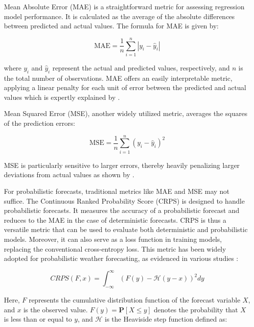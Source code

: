 \documentclass{article}
\begin{document}
Mean Absolute Error (MAE) is a straightforward metric for assessing regression model performance. It is calculated as the average of the absolute differences between predicted and actual values. The formula for MAE is given by:

\begin{equation}\label{eq:MAE}
\text{MAE} = \frac{1}{n} \sum_{i=1}^{n} \left| y_i - \hat{y}_i \right|
\end{equation}


where $y_i$ and $\hat{y}_i$ represent the actual and predicted values, respectively, and $n$ is the total number of observations. MAE offers an easily interpretable metric, applying a linear penalty for each unit of error between the predicted and actual values which is expertly explained by \cite{MAE_RMSE}.

Mean Squared Error (MSE), another widely utilized metric, averages the squares of the prediction errors:

\begin{equation}\label{eq:MSE}
\text{MSE} = \frac{1}{n} \sum_{i=1}^{n} (y_i - \hat{y}_i)^2
\end{equation}

MSE is particularly sensitive to larger errors, thereby heavily penalizing larger deviations from actual values as shown by \cite{MSE}.

For probabilistic forecasts, traditional metrics like MAE and MSE may not suffice. The Continuous Ranked Probability Score (CRPS) is designed to handle probabilistic forecasts. It measures the accuracy of a probabilistic forecast and reduces to the MAE in the case of deterministic forecasts. CRPS is thus a versatile metric that can be used to evaluate both deterministic and probabilistic models. Moreover, it can also serve as a loss function in training models, replacing the conventional cross-entropy loss. This metric has been widely adopted for probabilistic weather forecasting, as evidenced in various studies \cite{CRPS_example_1, CRPS_example_2, CRPS_example_3}:

\begin{equation}\label{eq:CRPS}
    CRPS(F, x) = \int_{-\infty}^{\infty} ( F(y) - \mathcal{H}(y-x) )^{2} dy
\end{equation}

Here, $F$ represents the cumulative distribution function of the forecast variable $X$, and $x$ is the observed value. $F(y) = \mathbf{P}[X \leq y]$ denotes the probability that $X$ is less than or equal to $y$, and $\mathcal{H}$ is the Heaviside step function defined as:
\end{document}
